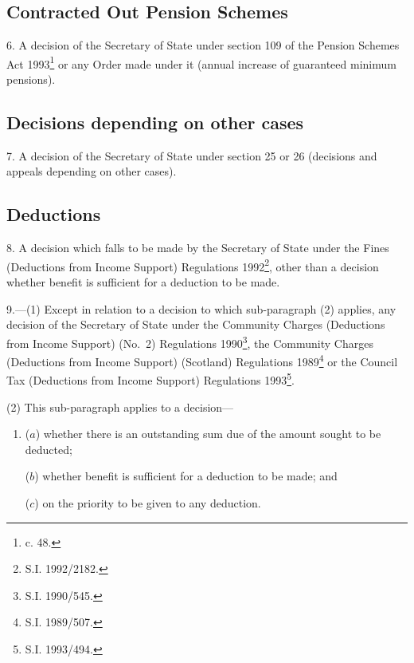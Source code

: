 \documentclass[12pt,a4paper]{article}
\begin{document}

\subsection*{Contracted Out Pension Schemes}

6.  A decision of the Secretary of State under section 109 of the Pension Schemes Act 1993\footnote{ c. 48.} or any Order made under it (annual increase of guaranteed minimum pensions).

\subsection*{Decisions depending on other cases}

7.  A decision of the Secretary of State under section 25 or 26 (decisions and appeals depending on other cases).

\subsection*{Deductions}

8.  A decision which falls to be made by the Secretary of State under the Fines (Deductions from Income Support) Regulations 1992\footnote{\frenchspacing S.I. 1992/2182.}, other than 
a decision whether benefit is sufficient for a deduction to be made.  %


\medskip

9.—(1) Except in relation to a decision to which sub-paragraph (2) applies, any decision of the Secretary of State under the Community Charges (Deductions from Income Support) (No.\ 2) Regulations 1990\footnote{\frenchspacing S.I. 1990/545.}, the Community Charges (Deductions from Income Support) (Scotland) Regulations 1989\footnote{\frenchspacing S.I. 1989/507.} or the Council Tax (Deductions from Income Support) Regulations 1993\footnote{\frenchspacing S.I. 1993/494.}.

(2) This sub-paragraph applies to a decision—
\begin{enumerate}\item[]
($a$) whether there is an outstanding sum due of the amount sought to be deducted;

($b$) whether benefit is sufficient for a deduction to be made; and

($c$) on the priority to be given to any deduction.
\end{enumerate}
\end{document}
